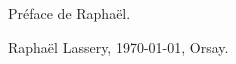 Préface de Raphaël.

\begin{flushright}
        Raphaël Lassery, \today, Orsay.
\end{flushright}
\pagebreak
